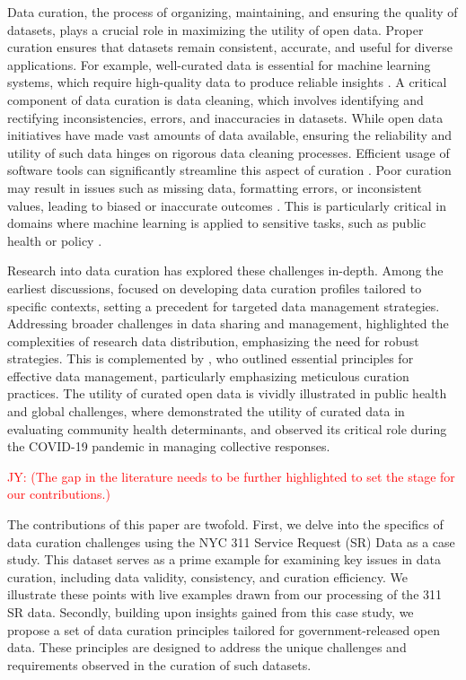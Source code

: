 \documentclass[linenumber]{jdsart}
\newcommand{\jy}[1]{\textcolor{red}{JY: (#1)}}
\begin{document}
Data curation, the process of organizing, maintaining, and ensuring
the quality of datasets, plays a crucial role in maximizing the
utility of open data. Proper curation ensures that datasets remain
consistent, accurate, and useful for diverse applications. For example, 
well-curated data is essential for machine learning systems, which 
require high-quality data to produce reliable insights 
\citep{polyzotis2019data, jain2020overview}. A critical component of 
data curation is data cleaning, which involves identifying and rectifying 
inconsistencies, errors, and inaccuracies in datasets. While open data 
initiatives have made vast amounts of data available, ensuring the 
reliability and utility of such data hinges on rigorous data cleaning processes. 
Efficient usage of software tools can significantly streamline this 
aspect of curation \citep[e.g.,][]{cody2017cody, van2018statistical}. Poor 
curation may result in issues such as missing data, formatting errors, 
or inconsistent values, leading to biased or inaccurate outcomes 
\citep{geiger2020garbage}. This is particularly critical in domains 
where machine learning is applied to sensitive tasks, such as public 
health or policy \citep{rahm2000data}.


Research into data curation has explored these challenges in-depth. 
Among the earliest discussions, \citet{witt2009constructing} focused 
on developing data curation profiles tailored to specific contexts, 
setting a precedent for targeted data management strategies. 
Addressing broader challenges in data sharing and management, 
\citet{borgman2012conundrum} highlighted the complexities of 
research data distribution, emphasizing the need for robust 
strategies. This is complemented by \citet{hart2016ten}, who outlined 
essential principles for effective data management, particularly 
emphasizing meticulous curation practices. The utility of curated 
open data is vividly illustrated in public health and global challenges, 
where \citet{cantor2018facets} demonstrated the utility of curated 
data in evaluating community health determinants, and 
\citet{shankar2021data} observed its critical role during the 
COVID-19 pandemic in managing collective responses.



\jy{The gap in the literature needs to be further highlighted to set 
  the stage for our contributions.}



The contributions of this paper are twofold. First, we delve into
the specifics of data curation challenges using the NYC 311 Service
Request (SR) Data as a case study. This dataset serves as a prime 
example for examining key issues in data curation, including data 
validity, consistency, and curation efficiency. We illustrate these 
points with live examples drawn from our 
processing of the 311 SR data. Secondly, building upon insights 
gained from this case study, we propose a set of data curation 
principles tailored for government-released open data. These 
principles are designed to address the unique challenges 
and requirements observed in the curation of such datasets.
\end{document}
